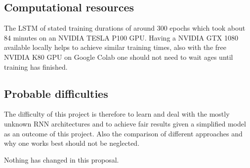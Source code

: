 \subsection{Computational resources}

The LSTM of \cite{Imran2021} stated training durations of around 300 epochs which took about 84 minutes on an NVIDIA TESLA P100 GPU. Having a NVIDIA GTX 1080 available locally helps to achieve similar training times, also with the free NVIDIA K80 GPU on Google Colab one should not need to wait ages until training has finished. 

\subsection{Probable difficulties}

The difficulty of this project is therefore to learn and deal with the mostly unknown RNN architectures and to achieve fair results given a simplified model as an outcome of this project. Also the comparison of different approaches and why one works best should not be neglected. 

\color{green}
Nothing has changed in this proposal.
\color{black}